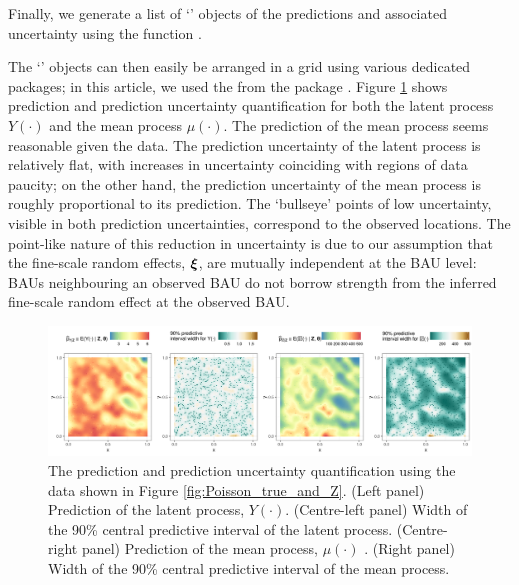 \documentclass[nojss]{jss}
\newcommand{\class}[1]{`\code{#1}'}
\newcommand{\fct}[1]{\code{#1()}}
\def\mbf#1{{%
\mathchoice%
{\hbox{\boldmath$\displaystyle{#1}$}}%
{\hbox{\boldmath$\textstyle{#1}$}}%
{\hbox{\boldmath$\scriptstyle{#1}$}}%
{\hbox{\boldmath$\scriptscriptstyle{#1}$}}%
}}
\def\vec{\mbf}
\begin{document}
Finally, we generate a list of \class{ggplot} \citep{Wickham_2016_ggplot2} objects of the predictions and associated uncertainty using the function \fct{plot}. 
The \class{ggplot} objects can then easily be arranged in a grid using various dedicated packages; in this article, we used the \fct{ggarrange} from the package  \citep{Kassambara_2020_ggpubr}. Figure \ref{fig:Poisson_nres3} shows prediction and prediction uncertainty quantification for both the latent process $Y(\cdot)$ and the mean process $\mu(\cdot)$. %
The prediction of the mean process seems reasonable given the data. 
The prediction uncertainty of the latent process is relatively flat, with increases in uncertainty coinciding with regions of data paucity; on the other hand, the prediction uncertainty of the mean process is roughly proportional to its prediction. %
The  `bullseye' points of low uncertainty, visible in both prediction uncertainties, correspond to the observed locations. 
The point-like nature of this reduction in uncertainty is due to our assumption that the fine-scale random effects, $\vec{\xi}$, are mutually independent at the BAU level: BAUs neighbouring an observed BAU do not borrow strength from the inferred fine-scale random effect at the observed BAU.
\begin{figure}[t!]
    \centering
    \includegraphics[width = \linewidth]{img/Poisson_sim.png}
    \caption{The prediction and prediction uncertainty quantification using the data shown in Figure \ref{fig:Poisson_true_and_Z}. (Left panel) Prediction of the latent process, $Y(\cdot)$. (Centre-left panel) Width of the 90\% central predictive interval of the latent process. (Centre-right panel) Prediction of the mean process, $\mu(\cdot)$ . (Right panel) Width of the 90\% central predictive interval of the mean process. 
}   
  \label{fig:Poisson_nres3}
\end{figure}
\end{document}
